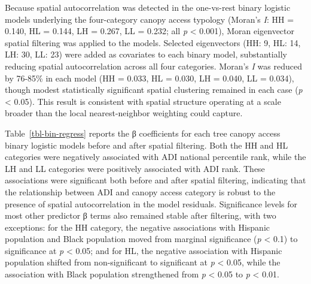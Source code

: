 \documentclass[
  sn-basic,
]{sn-jnl}
\begin{document}
\begin{table}
{}

\end{table}%

Because spatial autocorrelation was detected in the one-vs-rest binary
logistic models underlying the four-category canopy access typology
(Moran's \emph{I}: HH = 0.140, HL = 0.144, LH = 0.267, LL = 0.232; all
\emph{p} \textless{} 0.001), Moran eigenvector spatial filtering was
applied to the models. Selected eigenvectors (HH: 9, HL: 14, LH: 30, LL:
23) were added as covariates to each binary model, substantially
reducing spatial autocorrelation across all four categories. Moran's
\emph{I} was reduced by 76-85\% in each model (HH = 0.033, HL = 0.030,
LH = 0.040, LL = 0.034), though modest statistically significant spatial
clustering remained in each case (\emph{p} \textless{} 0.05). This
result is consistent with spatial structure operating at a scale broader
than the local nearest-neighbor weighting could capture.

Table~\ref{tbl-bin-regress} reports the β coefficients for each tree
canopy access binary logistic models before and after spatial filtering.
Both the HH and HL categories were negatively associated with ADI
national percentile rank, while the LH and LL categories were positively
associated with ADI rank. These associations were significant both
before and after spatial filtering, indicating that the relationship
between ADI and canopy access category is robust to the presence of
spatial autocorrelation in the model residuals. Significance levels for
most other predictor β terms also remained stable after filtering, with
two exceptions: for the HH category, the negative associations with
Hispanic population and Black population moved from marginal
significance (\emph{p} \textless{} 0.1) to significance at \emph{p}
\textless{} 0.05; and for HL, the negative association with Hispanic
population shifted from non-significant to significant at \emph{p}
\textless{} 0.05, while the association with Black population
strengthened from \emph{p} \textless{} 0.05 to \emph{p} \textless{}
0.01.
\end{document}
